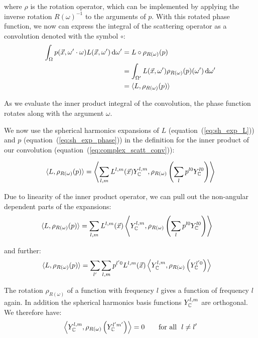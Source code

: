 \documentclass[10pt]{scrartcl}
\begin{document}
where $\rho$ is the rotation operator, which can be implemented by applying the inverse rotation $R(\omega)^{-1}$ to the arguments of $p$. With this rotated phase function, we now can express the integral of the scattering operator as a convolution denoted with the symbol $\circ$: 
\begin{align}
\int_{\Omega}p(\vec{x}, \omega'\cdot\omega)L(\vec{x}, \omega')\,\mathrm{d}\omega'
&=
L\circ \rho_{R(\omega)}(p) \nonumber\\
&=
\int_{\Omega'}{L(\vec{x}, \omega')\rho_{R(\omega)}(p)(\omega')\,\mathrm{d}\omega'} \nonumber\\
&= \langle L,  \rho_{R(\omega)}(p)\rangle
\label{eq:complex_scatt_conv}
\end{align}

As we evaluate the inner product integral of the convolution, the phase function rotates along with the argument $\omega$.

We now use the spherical harmonics expansions of $L$ (equation~(\ref{eq:sh_exp_L})) and $p$ (equation~(\ref{eq:sh_exp_phase})) in the definition for the inner product of our convolution (equation~(\ref{eq:complex_scatt_conv})):

\begin{align*}
\langle L,  \rho_{R(\omega)}(p)\rangle = \left < \sum_{l,m}{L^{l,m}(\vec{x}) Y_{\mathbb{C}}^{l,m}}, \rho_{R(\omega)}\left ( \sum_{l}{p^{l0}Y_{\mathbb{C}}^{l0}} \right )\right>
\end{align*}

Due to linearity of the inner product operator, we can pull out the non-angular dependent parts of the expansions:
\begin{align*}
\langle L,  \rho_{R(\omega)}(p)\rangle
&=
\sum_{l,m}
{
L^{l,m}(\vec{x})
\left<
Y_{\mathbb{C}}^{l,m},
\rho_{R(\omega)}
\left(\sum_l{p^{l0} Y_{\mathbb{C}}^{l0}}\right)
\right>
}
\end{align*}


and further:
\begin{align*}
\langle L,  \rho_{R(\omega)}(p)\rangle
&=
\sum_{l'}
{
\sum_{l,m}
{
p^{l'0}L^{l,m}(\vec{x})
\left<Y_{\mathbb{C}}^{l,m}, \rho_{R(\omega)}\left( Y_{\mathbb{C}}^{l'0} \right)\right>
}
}
\end{align*}

The rotation $\rho_{R(\omega)}$ of a function with frequency $l$ gives a function of frequency $l$ again. In addition the spherical harmonics basis functions $Y_{\mathbb{C}}^{l,m}$ are orthogonal. We therefore have:
\begin{align*}
\left<
Y_{\mathbb{C}}^{l,m}, \rho_{R(\omega)}\left(Y_{\mathbb{C}}^{l'm'}\right)
\right> = 0       \qquad    \text{for all}\ \ l\ne l' 
\end{align*}
\end{document}
